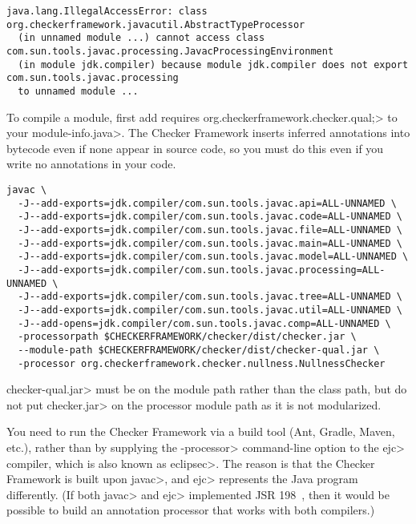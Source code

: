 \begin{Verbatim}
java.lang.IllegalAccessError: class org.checkerframework.javacutil.AbstractTypeProcessor
  (in unnamed module ...) cannot access class com.sun.tools.javac.processing.JavacProcessingEnvironment
  (in module jdk.compiler) because module jdk.compiler does not export com.sun.tools.javac.processing
  to unnamed module ...
\end{Verbatim}



To compile a module, first add \<requires
org.checkerframework.checker.qual;> to your \<module-info.java>.  The Checker
Framework inserts inferred annotations into bytecode even if none appear in source code,
so you must do this even if you write no annotations in your code.

\begin{Verbatim}
javac \
  -J--add-exports=jdk.compiler/com.sun.tools.javac.api=ALL-UNNAMED \
  -J--add-exports=jdk.compiler/com.sun.tools.javac.code=ALL-UNNAMED \
  -J--add-exports=jdk.compiler/com.sun.tools.javac.file=ALL-UNNAMED \
  -J--add-exports=jdk.compiler/com.sun.tools.javac.main=ALL-UNNAMED \
  -J--add-exports=jdk.compiler/com.sun.tools.javac.model=ALL-UNNAMED \
  -J--add-exports=jdk.compiler/com.sun.tools.javac.processing=ALL-UNNAMED \
  -J--add-exports=jdk.compiler/com.sun.tools.javac.tree=ALL-UNNAMED \
  -J--add-exports=jdk.compiler/com.sun.tools.javac.util=ALL-UNNAMED \
  -J--add-opens=jdk.compiler/com.sun.tools.javac.comp=ALL-UNNAMED \
  -processorpath $CHECKERFRAMEWORK/checker/dist/checker.jar \
  --module-path $CHECKERFRAMEWORK/checker/dist/checker-qual.jar \
  -processor org.checkerframework.checker.nullness.NullnessChecker
\end{Verbatim}

\<checker-qual.jar> must be on the module path rather than the class path, but
do not put \<checker.jar> on the processor module path as it is not
modularized.


\sectionAndLabel{Eclipse}{eclipse}


You
need to run the Checker Framework via a build tool (Ant, Gradle, Maven, etc.), rather
than by supplying the \<-processor> command-line option to the \<ejc>
compiler, which is also known as \<eclipsec>.
The reason is that the Checker Framework is built upon \<javac>,
and \<ejc> represents the Java program differently.  (If both \<javac> and \<ejc>
implemented JSR 198~\cite{JSR198}, then it would be possible to build
an annotation processor that works with both compilers.)



